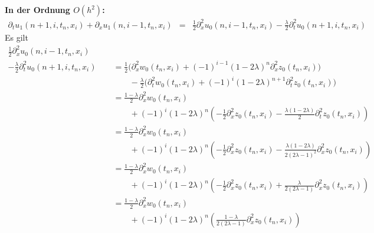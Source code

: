 \vspace{0.4cm}
\noindent \textbf{In der Ordnung $O(h^2)$:}
\begin{align*}
\partial_t u_1(n+1, i, t_n, x_i) + \partial_x u_1(n, i-1, t_n, x_i) &=
&\frac {1}{2} \partial^2_x u_0(n, i-1, t_n, x_i) - \frac{\lambda}{2} \partial^2_t u_0(n+1, i, t_n, x_i)
\end{align*}
Es gilt 
\begin{align*}
\frac {1}{2} \partial^2_x u_0(n, i-1, t_n, x_i) \qquad\\
- \frac{\lambda}{2} \partial^2_t u_0(n+1, i, t_n, x_i)
&= \frac{1}{2} \bigl( \partial^2_x w_0(t_n, x_i) + (-1)^{i-1} (1 - 2\lambda)^n \partial^2_x z_0(t_n, x_i) \bigr) \\
&\qquad - \frac{\lambda}{2} \bigl( \partial^2_t w_0(t_n, x_i) + (-1)^i (1 - 2\lambda)^{n+1} \partial^2_t z_0(t_n, x_i) \bigr)\\
&= \frac{1 - \lambda}{2}  \partial^2_x w_0(t_n, x_i)\\
&\qquad + (-1)^i (1 - 2\lambda)^{n} \left( - \frac{1}{2} \partial^2_x z_0(t_n, x_i) - \frac{\lambda (1 - 2\lambda)}{2} \partial^2_t z_0(t_n, x_i) \right)\\
&= \frac{1 - \lambda}{2}  \partial^2_x w_0(t_n, x_i)\\
&\qquad + (-1)^i (1 - 2\lambda)^{n} \left( - \frac{1}{2} \partial^2_x z_0(t_n, x_i) - \frac{\lambda (1 - 2\lambda)}{2 (2 \lambda - 1)^2} \partial^2_x z_0(t_n, x_i) \right)\\
&= \frac{1 - \lambda}{2}  \partial^2_x w_0(t_n, x_i)\\
&\qquad + (-1)^i (1 - 2\lambda)^{n} \left( - \frac{1}{2} \partial^2_x z_0(t_n, x_i) + \frac{\lambda}{2 (2 \lambda - 1)} \partial^2_x z_0(t_n, x_i) \right)\\
&= \frac{1 - \lambda}{2}  \partial^2_x w_0(t_n, x_i)\\
&\qquad + (-1)^i (1 - 2\lambda)^{n} \left( \frac{1 - \lambda}{2 (2 \lambda - 1)} \partial^2_x z_0(t_n, x_i) \right)
\end{align*}